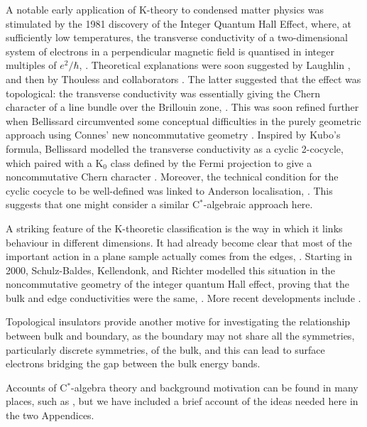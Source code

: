 \documentclass[11pt]{article}
\begin{document}
A notable early application of K-theory to condensed matter physics was stimulated by the 1981 discovery of the Integer Quantum Hall Effect, where, at sufficiently low temperatures, the transverse conductivity of a two-dimensional system of electrons  in a perpendicular magnetic field is quantised in integer multiples of $e^2/\hbar$, \cite{KDP}.  
Theoretical explanations were soon suggested by Laughlin  \cite{L81}, and then by Thouless and collaborators \cite{TKNN}. The latter suggested that the effect was topological: the transverse conductivity was essentially giving the Chern character of a line bundle over the Brillouin zone, \cite{ASS, NTW}.
This was soon refined further when Bellissard  circumvented some conceptual difficulties in the purely geometric approach using Connes' new noncommutative geometry \cite{C85,C94}. Inspired by Kubo's formula, Bellissard modelled the transverse conductivity as a cyclic 2-cocycle, which paired with a K$_0$ class defined by the Fermi projection to give a noncommutative Chern character \cite{B}.  Moreover, the technical condition for the cyclic cocycle to be well-defined was linked to Anderson localisation, \cite{BES}.
This suggests that one might consider a similar C$^*$-algebraic approach here.


A striking feature of the K-theoretic classification is the way in which it links behaviour in different dimensions.
It had already become clear that most of the important action in a plane sample actually comes from the edges, \cite{L81,MMP}. Starting in 2000, Schulz-Baldes, Kellendonk, and Richter modelled this situation in the noncommutative geometry of the integer quantum Hall effect,  proving that the bulk and edge conductivities were the same, \cite{SKR, KRS, KS1, KS2}. More recent developments include \cite{ASV}.

Topological insulators provide another motive for investigating the relationship between bulk and boundary, as the boundary may not share all the symmetries, particularly discrete symmetries,  of the bulk,  and this can lead to surface electrons bridging the gap between the bulk energy bands.  

Accounts of C$^*$-algebra theory and background motivation can be found in many places, such as \cite{RW}, but we have included a brief account of the ideas needed here in the two Appendices.

%
%
\end{document}
